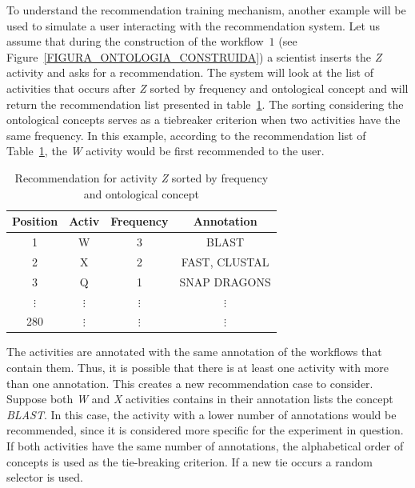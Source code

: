 \documentclass{doublecol-new}
\theoremstyle{TH}{
\newtheorem{lemma}{Lemma}
\newtheorem{theorem}[lemma]{Theorem}
\newtheorem{corrolary}[lemma]{Corrolary}
\newtheorem{conjecture}[lemma]{Conjecture}
\newtheorem{proposition}[lemma]{Proposition}
\newtheorem{claim}[lemma]{Claim}
\newtheorem{stheorem}[lemma]{Wrong Theorem}
\newtheorem{algorithm}{Algorithm}
}
\theoremstyle{THrm}{
\newtheorem{definition}{Definition}[section]
\newtheorem{question}{Question}[section]
\newtheorem{remark}{Remark}
\newtheorem{scheme}{Scheme}
}
\theoremstyle{THhit}{
\newtheorem{case}{Case}[section]
}
\begin{document}
To understand the recommendation training mechanism, another example will be used to simulate a user interacting with the recommendation system. Let us assume that during the construction of the workflow~\(1\) (see Figure~\ref{FIGURA_ONTOLOGIA_CONSTRUIDA}) a scientist inserts the \emph{Z} activity and asks for a recommendation. The system will look at the list of activities that occurs after \emph{Z} sorted by frequency and ontological concept and will return the recommendation list presented in table~\ref{tabela_lista_recomendacao_ordenada_frequencia}. The sorting considering the ontological concepts serves as a tiebreaker criterion when two activities have the same frequency. In this example, according to the recommendation list of Table~\ref{tabela_lista_recomendacao_ordenada_frequencia}, the \emph{W} activity would be first recommended to the user.


\begin{table}[!htb]
	\tiny
	\centering
	\caption{Recommendation for activity \emph{Z} sorted by frequency and ontological concept}
	\begin{tabular}{|c|c|c|c|}  \hline
		\textbf{Position} & \textbf{Activ} & \textbf{Frequency} & \textbf{Annotation} 	\\ \hline
		1				& W 				& 3 				& BLAST				\\ \hline
		2				& X 				& 2 				& FAST, CLUSTAL		\\ \hline
		3				& Q 				& 1 				& SNAP DRAGONS		\\ \hline
		\(\vdots\)		& \(\vdots\)		& \(\vdots\) 		& \(\vdots\)		\\ \hline
		280				& \(\vdots\)		& \(\vdots\)		& \(\vdots\)	\\ \hline
	\end{tabular}
	\label{tabela_lista_recomendacao_ordenada_frequencia}
	\vspace{0.1cm}
\end{table}

The activities are annotated with the same annotation of the workflows that contain them. Thus, it is possible that there is at least one activity with more than one annotation. This creates a new recommendation case to consider. Suppose both \emph{W} and \emph{X} activities contains in their annotation lists the concept \emph{BLAST}. In this case, the activity with a lower number of annotations would be recommended, since it is considered more specific for the experiment in question. If both activities have the same number of annotations, the alphabetical order of concepts is used as the tie-breaking criterion. If a new tie occurs a random selector is used.
\end{document}
